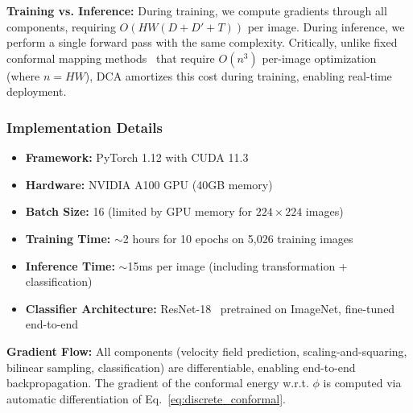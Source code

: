 \textbf{Training vs. Inference:} During training, we compute gradients through all components, requiring $O(HW(D + D' + T))$ per image. During inference, we perform a single forward pass with the same complexity. Critically, unlike fixed conformal mapping methods~\cite{huang2024surface} that require $O(n^3)$ per-image optimization (where $n = HW$), DCA amortizes this cost during training, enabling real-time deployment.

\subsubsection{Implementation Details}

\begin{itemize}
    \item \textbf{Framework:} PyTorch 1.12 with CUDA 11.3
    \item \textbf{Hardware:} NVIDIA A100 GPU (40GB memory)
    \item \textbf{Batch Size:} 16 (limited by GPU memory for $224 \times 224$ images)
    \item \textbf{Training Time:} $\sim$2 hours for 10 epochs on 5,026 training images
    \item \textbf{Inference Time:} $\sim$15ms per image (including transformation + classification)
    \item \textbf{Classifier Architecture:} ResNet-18~\cite{he2016resnet} pretrained on ImageNet, fine-tuned end-to-end
\end{itemize}

\textbf{Gradient Flow:} All components (velocity field prediction, scaling-and-squaring, bilinear sampling, classification) are differentiable, enabling end-to-end backpropagation. The gradient of the conformal energy w.r.t. $\phi$ is computed via automatic differentiation of Eq.~\eqref{eq:discrete_conformal}.
